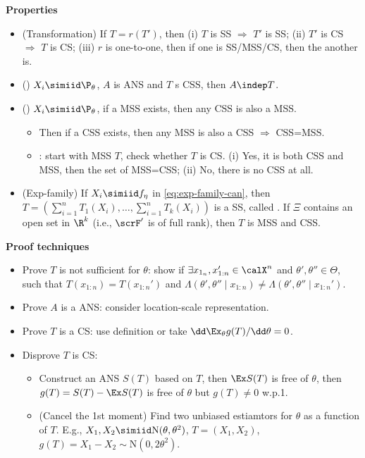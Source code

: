 \documentclass[10pt,a4paper]{article}
\begin{document}
\noindent\textbf{Properties}
\begin{itemize}
	\item (Transformation) If $T=r(T')$, then (i) $T$ is SS $\Rightarrow$ $T'$ is SS; (ii) $T'$ is CS $\Rightarrow$ $T$ is CS; (iii) $r$ is one-to-one, then if one is SS/MSS/CS, then the another is.    
	\item () $X_i\simiid\P_\theta$, $A$ is ANS and $T$ s CSS, then $A \indep T$.
	\item () $X_i\simiid\P_\theta$, if a MSS exists, then any CSS is also a MSS.
	\begin{itemize}
		\item Then if a CSS exists, then any MSS is also a CSS $\Rightarrow$ CSS=MSS.
		\item {}: start with MSS $T$, check whether $T$ is CS. (i) Yes, it is both CSS and MSS, then the set of MSS=CSS; (ii) No, there is no CSS at all.  
	\end{itemize}
	\item (Exp-family) If $X_i\simiid f_{\eta}$ in \eqref{eq:exp-family-can}, then $T=(\sum_{i=1}^nT_1(X_i),\ldots,\sum_{i=1}^nT_k(X_i))$ is a SS, called . If $\Xi$ contains an open set in $\R^k$ (i.e., $\scrF'$ is of full rank), then $T$ is MSS and CSS. 
\end{itemize}

\noindent\textbf{Proof techniques}
\begin{itemize}
	\item Prove $T$ is not sufficient for $\theta$: show if $\exists x_{1_n}, x_{1:n}'\in\calX^n$ and $\theta',\theta''\in\Theta$, such that $T(x_{1:n})=T(x_{1:n}')$ and $\Lambda(\theta',\theta''\mid x_{1:n})\neq \Lambda(\theta',\theta''\mid x_{1:n}')$.  
	\item Prove $A$ is a ANS: consider location-scale representation.
	\item Prove $T$ is a CS: use definition or take $\dd\Ex_{\theta}g(T)/\dd\theta=0$. 
	\item Disprove $T$ is CS: 
	\begin{itemize}
		\item Construct an ANS $S(T)$ based on $T$, then $\Ex S(T)$ is free of $\theta$, then $g(T)=S(T)-\Ex S(T)$ is free of $\theta$ but $g(T)\neq 0$ w.p.1. 
		\item (Cancel the 1st moment) Find two unbiased estiamtors for $\theta$ as a function of $T$. E.g., $X_1,X_2\simiid \mathrm{N}(\theta,\theta^2)$, $T=(X_1,X_2)$, $g(T)=X_1-X_2\sim\mathrm{N}(0,2\theta^2)$. 
	\end{itemize}
	
\end{itemize}
\end{document}
